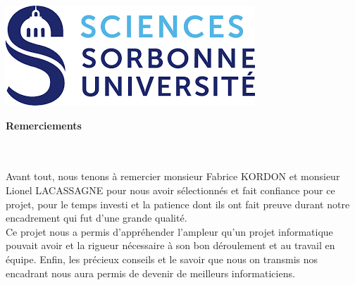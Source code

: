 \documentclass[12pt]{article}
\begin{document}
\begin{titlepage}




\includegraphics[scale=0.5]{logo.png}\\[1cm] %
 

\vfill %

\end{titlepage}




\vspace*{\fill}

\begin{center}
    \textbf{\Large Remerciements}
    \\~\\~\\
\end{center}
Avant tout, nous tenons à remercier monsieur Fabrice KORDON et monsieur Lionel LACASSAGNE pour nous avoir sélectionnés et fait confiance pour ce projet, pour le temps investi et la patience dont ils ont fait preuve durant notre encadrement qui fut d'une grande qualité.\\ 
Ce projet nous a permis d'appréhender l'ampleur qu'un projet informatique pouvait avoir et la rigueur nécessaire à son bon déroulement et au travail en équipe. Enfin, les précieux conseils et le savoir que nous on transmis nos encadrant nous aura permis de devenir de meilleurs informaticiens.
\vspace*{\fill}
\end{document}
